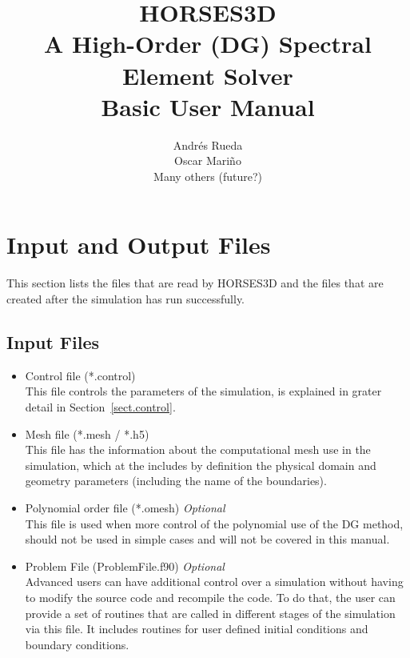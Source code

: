 \documentclass[a4paper,10pt]{report}
\title{\textbf{HORSES3D} \\ A \textbf{H}igh-\textbf{Or}der (DG) \textbf{S}pectral \textbf{E}lement \textbf{S}olver \\ \textbf{Basic User Manual}}
\author{Andrés Rueda \\ Oscar Mariño \\ Many others (future?)}
\begin{document}
\maketitle

\tableofcontents


\chapter{Input and Output Files}\label{chap.IO}

This section lists the files that are read by HORSES3D and the files that are created after the simulation has run successfully.

\section{Input Files}

\begin{itemize}
\item Control file (*.control) \\
This file controls the parameters of the simulation, is explained in grater detail in Section~\ref{sect.control}.
\item Mesh file (*.mesh / *.h5) \\
This file has the information about the computational mesh use in the simulation, which at the includes by definition the physical domain and geometry parameters (including the name of the boundaries).
\item Polynomial order file (*.omesh) \emph{Optional} \\
This file is used when more control of the polynomial use of the DG method, should not be used in simple cases and will not be covered in this manual.
\item Problem File (ProblemFile.f90) \emph{Optional} \\
Advanced users can have additional control over a simulation without having to modify the source code and recompile the code. To do that, the user can provide a set of routines that are called in different stages of the simulation via this file. It includes routines for user defined initial conditions and boundary conditions.
\end{itemize}
\end{document}
